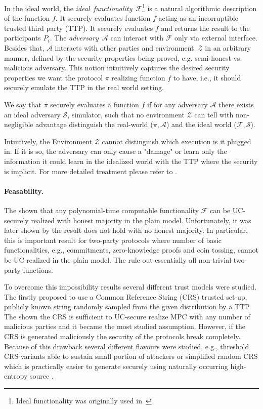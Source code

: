 \documentclass[
  digital, %
  twoside, %
  table,   %
  lof,     %
  lot,     %
]{fithesis3}
\begin{document}
In the ideal world, the \emph{ideal~functionality}~$\mathcal{F}$\footnote{Ideal functionality was originally used in~\cite{GMW87}} is a natural algorithmic description of the function $f$. It securely evaluates function $f$ acting as an incorruptible trusted third party (TTP). It securely evaluates $f$ and returns the result to the participants $P_i$. The \emph{adversary}~$\mathcal{A}$ can interact with $\mathcal{F}$ only via external interface. Besides that, $\mathcal{A}$ interacts with other parties and environment~$\mathcal{Z}$ in an arbitrary manner, defined by the security properties being proved, e.g. semi-honest vs. malicious adversary.
This notion intuitively captures the desired security properties we want the protocol $\pi$ realizing function $f$ to have, i.e., it should securely emulate the TTP in the real world setting.

We say that $\pi$ securely evaluates a function $f$ if for any adversary $\mathcal{A}$ there exists an ideal adversary $\mathcal{S}$, simulator, such that no environment $\mathcal{Z}$ can tell with non-negligible advantage distinguish the real-world ($\pi, \mathcal{A}$) and the ideal world ($\mathcal{F}, \mathcal{S}$).

Intuitively, the Environment $\mathcal{Z}$ cannot distinguish which execution is it plugged in. If it is so, the adversary can only cause a "damage" or learn only the information it could learn in the idealized world with the TTP where the security is implicit. For more detailed treatment please refer to \cite{Can01, CLOS02, Lin03, G09, CDN15, Lin17}.

\paragraph{Feasability.}
The \cite{Can01} shown that any polynomial-time computable functionality $\mathcal{F}$ can be UC-securely realized with honest majority in the plain model. Unfortunately, it was later shown by \cite{CF01} the result does not hold with no honest majority. In particular, this is important result for two-party protocols where number of basic functionalities, e.g., commitments, zero-knowledge proofs and coin tossing, cannot be UC-realized in the plain model. The \cite{Lin03, CKL04, CKL06} rule out essentially all non-trivial two-party functions.

To overcome this impossibility results several different trust models were studied. 
The \cite{CF01} firstly proposed to use a Common Reference String (CRS) trusted set-up, publicly known string randomly sampled from the given distribution by a TTP. The \cite{CLOS02} shown the CRS is sufficient to UC-secure realize MPC with any number of malicious parties and it became the most studied assumption. However, if the CRS is generated maliciously the security of the protocols break completely. Because of this drawback several different flavours were studied, e.g., threshold CRS variants able to sustain small portion of attackers or simplified random CRS which is practically easier to generate securely using naturally occurring high-entropy source \cite{CPS07}.
\end{document}
